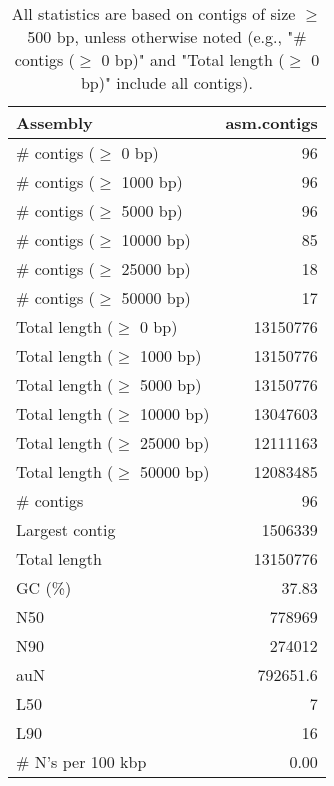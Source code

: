 \documentclass[12pt,a4paper]{article}
\begin{document}
\begin{table}[ht]
\begin{center}
\caption{All statistics are based on contigs of size $\geq$ 500 bp, unless otherwise noted (e.g., "\# contigs ($\geq$ 0 bp)" and "Total length ($\geq$ 0 bp)" include all contigs).}
\begin{tabular}{|l*{1}{|r}|}
\hline
Assembly & asm.contigs \\ \hline
\# contigs ($\geq$ 0 bp) & 96 \\ \hline
\# contigs ($\geq$ 1000 bp) & 96 \\ \hline
\# contigs ($\geq$ 5000 bp) & 96 \\ \hline
\# contigs ($\geq$ 10000 bp) & 85 \\ \hline
\# contigs ($\geq$ 25000 bp) & 18 \\ \hline
\# contigs ($\geq$ 50000 bp) & 17 \\ \hline
Total length ($\geq$ 0 bp) & 13150776 \\ \hline
Total length ($\geq$ 1000 bp) & 13150776 \\ \hline
Total length ($\geq$ 5000 bp) & 13150776 \\ \hline
Total length ($\geq$ 10000 bp) & 13047603 \\ \hline
Total length ($\geq$ 25000 bp) & 12111163 \\ \hline
Total length ($\geq$ 50000 bp) & 12083485 \\ \hline
\# contigs & 96 \\ \hline
Largest contig & 1506339 \\ \hline
Total length & 13150776 \\ \hline
GC (\%) & 37.83 \\ \hline
N50 & 778969 \\ \hline
N90 & 274012 \\ \hline
auN & 792651.6 \\ \hline
L50 & 7 \\ \hline
L90 & 16 \\ \hline
\# N's per 100 kbp & 0.00 \\ \hline
\end{tabular}
\end{center}
\end{table}
\end{document}
